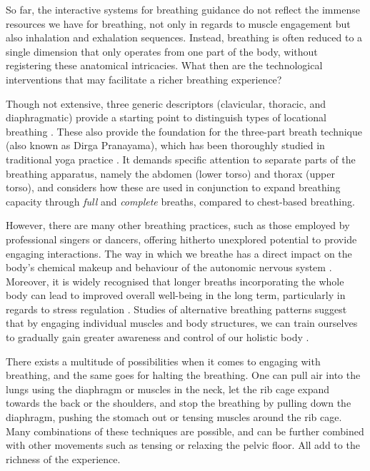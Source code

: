 So far, the interactive systems for breathing guidance do not reflect the immense resources we have for breathing, not only in regards to muscle engagement but also inhalation and exhalation sequences. Instead, breathing is often reduced to a single dimension that only operates from one part of the body, without registering these anatomical intricacies. What then are the technological interventions that may facilitate a richer breathing experience?

Though not extensive, three generic descriptors (clavicular, thoracic, and diaphragmatic) provide a starting point to distinguish types of locational breathing \cite{rama_science_1998}. These also provide the foundation for the three-part breath technique (also known as Dirga Pranayama), which has been thoroughly studied in traditional yoga practice \cite{sengupta_health_2012}. It demands specific attention to separate parts of the breathing apparatus, namely the abdomen (lower torso) and thorax (upper torso), and considers how these are used in conjunction to expand breathing capacity through \textit{full} and \textit{complete} breaths, compared to chest-based breathing.

However, there are many other breathing practices, such as those employed by professional singers or dancers, offering hitherto unexplored potential to provide engaging interactions. The way in which we breathe has a direct impact on the body's chemical makeup and behaviour of the autonomic nervous system \cite{russo_physiological_2017}. Moreover, it is widely recognised that longer breaths incorporating the whole body can lead to improved overall well-being in the long term, particularly in regards to stress regulation \cite{moraveji_peripheral_2011}. Studies of alternative breathing patterns suggest that by engaging individual muscles and body structures, we can train ourselves to gradually gain greater awareness and control of our holistic body \cite{van_dixhoorn_whole_2007}.

There exists a multitude of possibilities when it comes to engaging with breathing, and the same goes for halting the breathing. One can pull air into the lungs using the diaphragm or muscles in the neck, let the rib cage expand towards the back or the shoulders, and stop the breathing by pulling down the diaphragm, pushing the stomach out or tensing muscles around the rib cage. Many combinations of these techniques are possible, and can be further combined with other movements such as tensing or relaxing the pelvic floor. All add to the richness of the experience.

